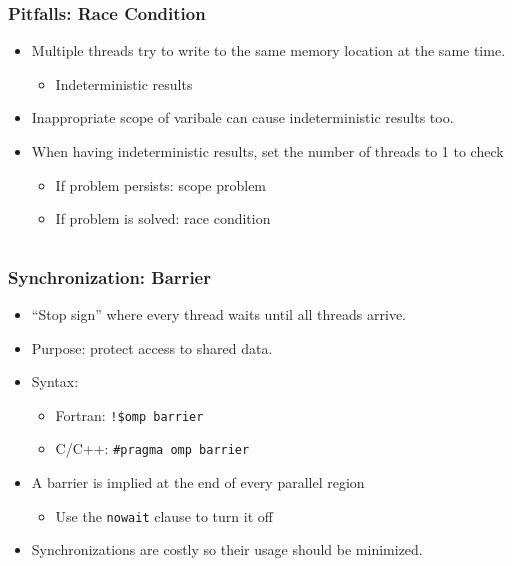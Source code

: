 \documentclass[c,mathserif,compress,xcolor=svgnames]{beamer}
\newenvironment{eblock}[0]
{
\begin{beamerboxesrounded}[upper=uppercol2,lower=lowercol2,shadow=true]}
{\end{beamerboxesrounded}}
\begin{document}
\begin{frame}
  \frametitle{\small Pitfalls: Race Condition}
  \begin{itemize}
    \item Multiple threads try to write to the same memory location at the same time.
    \begin{itemize}
      \item Indeterministic results
    \end{itemize}
    \item Inappropriate scope of varibale can cause indeterministic results too.
    \item When having indeterministic results, set the number of threads to 1 to check
    \begin{itemize}
      \item If problem persists: scope problem
      \item If problem is solved: race condition
    \end{itemize}
  \end{itemize}
  \begin{columns}
    \begin{eblock}{}
      
    \end{eblock}
  \end{columns}
\end{frame}

\begin{frame}
  \frametitle{\small Synchronization: Barrier}
  \begin{itemize}
    \item ``Stop sign'' where every thread waits until all threads arrive.
    \item Purpose: protect access to shared data.
    \item Syntax:
    \begin{itemize}
      \item Fortran: \texttt{!\$omp barrier}
      \item C/C++: \texttt{\#pragma omp barrier}
    \end{itemize}
    \item A barrier is implied at the end of every parallel region
    \begin{itemize}
      \item Use the \texttt{nowait} clause to turn it off
    \end{itemize}
    \item Synchronizations are costly so their usage should be minimized.
  \end{itemize}
\end{frame}
\end{document}
